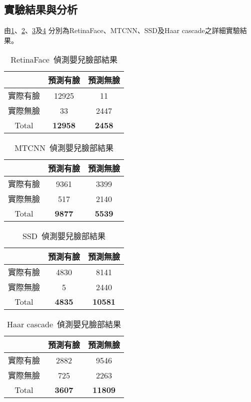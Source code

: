 \documentclass[class=NCU_thesis, crop=false]{standalone}
\begin{document}
\subsection{實驗結果與分析}
由\cref{table:table-retinaface}、\cref{table:table-mtcnn}、\cref{table:table-ssd}及\cref{table:table-opencv}
分別為RetinaFace、MTCNN、SSD及Haar cascade之詳細實驗結果。

\begin{table}[h]
    \centering
    \caption{RetinaFace~\cite{deng_retinaface_2020}偵測嬰兒臉部結果}
    \label{table:table-retinaface}
    \begin{tabular}{ccc}
    \hline
     & 預測有臉 & 預測無臉 \\
    \hline
    實際有臉 & 12925 & 11 \\
    實際無臉 & 33 & 2447 \\
    \hline
    Total & \textbf{12958} & \textbf{2458} \\
    \hline
    \end{tabular}
\end{table}

\begin{table}[h]
    \centering
    \caption{MTCNN~\cite{zhang_joint_2016}偵測嬰兒臉部結果}
    \label{table:table-mtcnn}
    \begin{tabular}{ccc}
    \hline
     & 預測有臉 & 預測無臉 \\
    \hline
    實際有臉 & 9361 & 3399 \\
    實際無臉 & 517 & 2140 \\
    \hline
    Total & \textbf{9877} & \textbf{5539} \\
    \hline
    \end{tabular}
\end{table}

\begin{table}[h]
    \centering
    \caption{SSD~\cite{ye_face_2021}偵測嬰兒臉部結果}
    \label{table:table-ssd}
    \begin{tabular}{ccc}
    \hline
     & 預測有臉 & 預測無臉 \\
    \hline
    實際有臉 & 4830 & 8141 \\
    實際無臉 & 5 & 2440 \\
    \hline
    Total & \textbf{4835} & \textbf{10581} \\
    \hline
    \end{tabular}
\end{table}

\begin{table}[h]
    \centering
    \caption{Haar cascade~\cite{goyal_face_2017}偵測嬰兒臉部結果}
    \label{table:table-opencv}
    \begin{tabular}{ccc}
    \hline
     & 預測有臉 & 預測無臉 \\
    \hline
    實際有臉 & 2882 & 9546 \\
    實際無臉 & 725 & 2263 \\
    \hline
    Total & \textbf{3607} & \textbf{11809} \\
    \hline
    \end{tabular}
\end{table}
\end{document}
